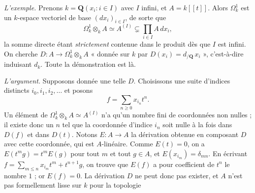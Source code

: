 \documentclass[11pt,a4paper]{article}
\begin{document}
\emph{L'exemple.} Prenons $k = \mathbf{Q}(x_i : i \in I)$ avec $I$ infini, et
$A = k[[t]]$. Alors $\Omega^1_{k}$ est un $k$-espace vectoriel de base
$(dx_i)_{i \in I}$, de sorte que
\[
  \Omega^1_{k} \otimes_{k} A \simeq A^{(I)} \subsetneq \prod_{i \in I} A\,dx_i ,
\]
la somme directe étant \emph{strictement} contenue dans le produit dès que $I$
est infini. On cherche $D : A \to \Omega^1_k \otimes_k A$ « donnée sur $k$ par
$D(x_i) = d_{/\mathbf{Q}}\, x_i$ », c'est-à-dire induisant $d_k$. Toute la
démonstration est là.

\emph{L'argument.} Supposons donnée une telle $D$. Choisissons une suite
d'indices distincts $i_0, i_1, i_2, \ldots$ et posons
\[
  f = \sum_{n \geqslant 0} x_{i_n} t^{n} .
\]
Un élément de $\Omega^1_k \otimes_k A \simeq A^{(I)}$ n'a qu'un nombre fini de
coordonnées non nulles ; il existe donc un $n$ tel que la coordonnée d'indice
$i_n$ soit nulle à la fois dans $D(f)$ et dans $D(t)$. Notons $E : A \to A$ la
dérivation obtenue en composant $D$ avec cette coordonnée, qui est
$A$-linéaire. Comme $E(t) = 0$, on a $E(t^m g) = t^m E(g)$ pour tout $m$ et
tout $g \in A$, et $E(x_{i_m}) = \delta_{mn}$. En écrivant $f = \sum_{m
\leqslant n} x_{i_m} t^m + t^{n+1} g$, on trouve que $E(f)$ a pour coefficient
de $t^n$ le nombre $1$ ; or $E(f) = 0$. La dérivation $D$ ne peut donc pas
exister, et $A$ n'est pas formellement lisse sur $k$ pour la topologie
\end{document}
